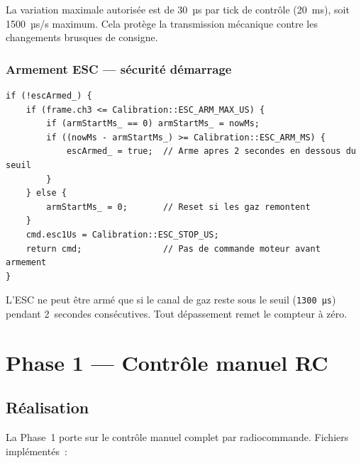 \documentclass[12pt,a4paper]{article}
\newcommand{\us}[1]{\texttt{#1\,µs}}
\begin{document}
La variation maximale autorisée est de 30~µs par tick de contrôle (20~ms),
soit 1500~µs/s maximum. Cela protège la transmission mécanique contre les
changements brusques de consigne.

\subsubsection{Armement ESC — sécurité démarrage}

\begin{lstlisting}[style=cpp, caption={ManualController.cpp -- procedure d'armement}]
if (!escArmed_) {
    if (frame.ch3 <= Calibration::ESC_ARM_MAX_US) {
        if (armStartMs_ == 0) armStartMs_ = nowMs;
        if ((nowMs - armStartMs_) >= Calibration::ESC_ARM_MS) {
            escArmed_ = true;  // Arme apres 2 secondes en dessous du seuil
        }
    } else {
        armStartMs_ = 0;       // Reset si les gaz remontent
    }
    cmd.esc1Us = Calibration::ESC_STOP_US;
    return cmd;                // Pas de commande moteur avant armement
}
\end{lstlisting}

L'ESC ne peut être armé que si le canal de gaz reste sous le seuil
(\us{1300}) pendant 2~secondes consécutives. Tout dépassement remet le
compteur à zéro.

\section{Phase 1 — Contrôle manuel RC}

\subsection{Réalisation}

La Phase~1 porte sur le contrôle manuel complet par radiocommande.
Fichiers implémentés~:
\end{document}

